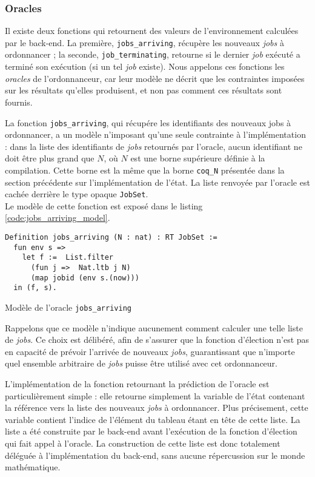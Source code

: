 	\subsubsection{Oracles}

	Il existe deux fonctions qui retournent des valeurs de l'environnement calculées par le back-end. La première, \texttt{jobs\_arriving}, récupère les nouveaux \emph{jobs} à ordonnancer ; la seconde, \texttt{job\_terminating}, retourne si le dernier \emph{job} exécuté a terminé son exécution (si un tel \emph{job} existe). Nous appelons ces fonctions les \emph{oracles} de l'ordonnanceur, car leur modèle ne décrit que les contraintes imposées sur les résultats qu'elles produisent, et non pas comment ces résultats sont fournis.

	La fonction \texttt{jobs\_arriving}, qui récupére les identifiants des nouveaux jobs à ordonnancer, a un modèle n'imposant qu'une seule contrainte à l'implémentation : dans la liste des identifiants de \emph{jobs} retournés par l'oracle, aucun identifiant ne doit être plus grand que $N$, où $N$ est une borne supérieure définie à la compilation. Cette borne est la même que la borne \texttt{coq\_N} présentée dans la section précédente sur l'implémentation de l'état. La liste renvoyée par l'oracle est cachée derrière le type opaque \texttt{JobSet}.\\
	Le modèle de cette fonction est exposé dans le listing \ref{code:jobs_arriving_model}.

	\begin{listing}[!ht]
	\begin{verbatim}
Definition jobs_arriving (N : nat) : RT JobSet :=
  fun env s =>
    let f :=  List.filter
      (fun j =>  Nat.ltb j N)
      (map jobid (env s.(now))) 
  in (f, s).
	\end{verbatim}
	\caption{Modèle de l'oracle \texttt{jobs\_arriving}}
	\label{code:jobs_arriving_model}
	\end{listing}

	Rappelons que ce modèle n'indique aucunement comment calculer une telle liste de \emph{jobs}. Ce choix est délibéré, afin de s'assurer que la fonction d'élection n'est pas en capacité de prévoir l'arrivée de nouveaux \emph{jobs}, guarantissant que n'importe quel ensemble arbitraire de \emph{jobs} puisse être utilisé avec cet ordonnanceur.

	L'implémentation de la fonction retournant la prédiction de l'oracle est particulièrement simple : elle retourne simplement la variable de l'état contenant la référence vers la liste des nouveaux \emph{jobs} à ordonnancer. Plus précisement, cette variable contient l'indice de l'élément du tableau étant en tête de cette liste. La liste a été construite par le back-end avant l'exécution de la fonction d'élection qui fait appel à l'oracle. La construction de cette liste est donc totalement déléguée à l'implémentation du back-end, sans aucune répercussion sur le monde mathématique.

